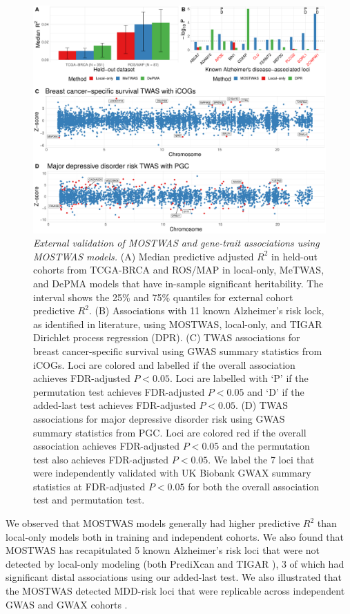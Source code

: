 \begin{figure}[htbp]
	\includegraphics[width = \textwidth]{figures/ch4_fig5.pdf}
	\caption{\emph{External validation of MOSTWAS
	and gene-trait associations
	using MOSTWAS models.} (A) Median predictive
	adjusted $R^2$ in held-out cohorts
	from TCGA-BRCA and ROS/MAP in local-only,
	MeTWAS, and DePMA models that have in-sample significant
	heritability. The interval
	shows the 25\% and 75\% quantiles for external cohort
	predictive $R^2$.
	(B) Associations with 11 known Alzheimer's risk lock,
	as identified in literature, using MOSTWAS, local-only,
	and TIGAR Dirichlet process regression (DPR). (C) TWAS
	associations for breast cancer-specific survival using
	GWAS summary statistics from iCOGs. Loci are colored and
	labelled if the overall association achieves FDR-adjusted 
	$P < 0.05$. Loci
	are labelled with `P' if the permutation test achieves FDR-adjusted $P < 0.05$ and `D' if the added-last
	test achieves FDR-adjusted $P < 0.05$.
	(D) TWAS
	associations for major
	depressive disorder risk using
	GWAS summary statistics from PGC. 
	Loci are colored red if the overall association achieves FDR-adjusted 
	$P < 0.05$ and the permutation test also achieves FDR-adjusted $P < 0.05$.
	We label the 7 loci that
	were independently validated
	with UK Biobank GWAX summary
	statistics at FDR-adjusted
	$P < 0.05$ 
	for both the overall association test
	and permutation test.}
	\label{fig:ch4_fig5}
\end{figure}


We observed that MOSTWAS models generally had 
higher predictive $R^2$ than local-only
models both in training and independent
cohorts. We also found that MOSTWAS
has recapitulated 5 known Alzheimer's
risk loci that were not detected
by local-only modeling (both PrediXcan \cite{Gamazon2015} 
and TIGAR \cite{Nagpal2019}),
3 of which had significant distal associations
using our added-last test.
We also
illustrated that the MOSTWAS detected
MDD-risk loci that were replicable across independent
GWAS and GWAX 
cohorts \cite{Wray2018Genome-wideDepression,Liu2017Case-controlDisease}.

